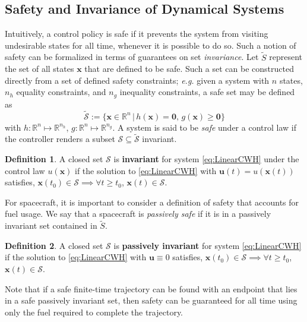 \documentclass[twocolumn,letterpaper]{IEEEAerospaceCLS}  %
\theoremstyle{definition}
\begin{document}
\subsection{Safety and Invariance of Dynamical Systems}
Intuitively, a control policy is safe if it prevents the system from visiting undesirable states for all time, whenever it is possible to do so.
Such a notion of safety can be formalized in terms of guarantees on set \emph{invariance}. 
Let $\tilde{S}$ represent the set of all states $\boldsymbol{x}$ that are defined to be safe. 
Such a set can be constructed directly from a set of defined safety constraints; \emph{e.g.} given a system with $n$ states, $n_h$ equality constraints, and $n_g$ inequality constraints, a safe set may be defined as 
\begin{equation}
  \tilde{{\mathcal{S}}} := \{\boldsymbol{x} \in {\mathbb R}^n \, | \, h(\boldsymbol{x})=\boldsymbol{0}, \, g(\boldsymbol{x}) \geq \boldsymbol{0} \}
\end{equation}
with $h:{\mathbb R}^n\mapsto{\mathbb R}^{n_h}$, $g:{\mathbb R}^n\mapsto{\mathbb R}^{n_g}$. 
A system is said to be \emph{safe} under a control law if the controller renders a subset ${\mathcal{S}}\subseteq\tilde{{\mathcal{S}}}$ invariant. 
\newtheorem{Definition}{\textbf{Definition}}
\begin{Definition}\label{lemma 1} 
A closed set ${\mathcal{S}}$ is \textbf{invariant} for system \eqref{eq:LinearCWH} under the control law $u(\boldsymbol{x})$ if the solution to \eqref{eq:LinearCWH} with $\boldsymbol{u}(t)=u(\boldsymbol{x}(t))$ satisfies, 
$\boldsymbol{x}(t_0) \in {\mathcal{S}} \implies \forall t\geq t_0$, $\boldsymbol{x}(t)\in {\mathcal{S}}$.
\end{Definition}
For spacecraft, it is important to consider a definition of safety that accounts for fuel usage. 
We say that a spacecraft is \emph{passively safe} if it is in a passively invariant set contained in $\tilde{S}$. 
\begin{Definition}\label{lemma 1} 
A closed set ${\mathcal{S}}$ is \textbf{passively invariant} for system \eqref{eq:LinearCWH} if the solution to \eqref{eq:LinearCWH} with $\boldsymbol{u}\equiv0$ satisfies, 
$\boldsymbol{x}(t_0) \in {\mathcal{S}} \implies \forall t\geq t_0$, $\boldsymbol{x}(t)\in {\mathcal{S}}$.
\end{Definition}
Note that if a safe finite-time trajectory can be found with an endpoint that lies in a safe passively invariant set, then safety can be guaranteed for all time using only the fuel required to complete the trajectory. 
\end{document}
